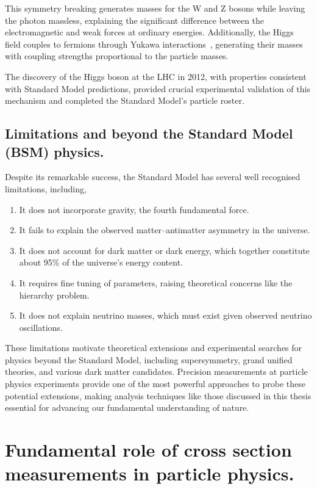 \begin{definition}
This symmetry breaking generates masses for the W and Z bosons while leaving the photon massless, explaining the significant difference between the electromagnetic and weak forces at ordinary energies. Additionally, the Higgs field couples to fermions through Yukawa interactions~\cite{DHoker1984DecouplingTheory}, generating their masses with coupling strengths proportional to the particle masses.

The discovery of the Higgs boson at the LHC in 2012, with properties consistent with Standard Model predictions, provided crucial experimental validation of this mechanism and completed the Standard Model's particle roster.

\subsection{Limitations and beyond the Standard Model (BSM) physics.}
Despite its remarkable success, the Standard Model has several well recognised limitations, including,

    \begin{enumerate}
        \item It does not incorporate gravity, the fourth fundamental force.
        \item It fails to explain the observed matter--antimatter asymmetry in the universe.
        \item It does not account for dark matter or dark energy, which together constitute about 95\% of the universe's energy content.
        \item  It requires fine tuning of parameters, raising theoretical concerns like the hierarchy problem.
        \item  It does not explain neutrino masses, which must exist given observed neutrino oscillations.
    \end{enumerate}
These limitations motivate theoretical extensions and experimental searches for physics beyond the Standard Model, including supersymmetry, grand unified theories, and various dark matter candidates.
%
Precision measurements at particle physics experiments provide one of the most powerful approaches to probe these potential extensions, making analysis techniques like those discussed in this thesis essential for advancing our fundamental understanding of nature.

\section{Fundamental role of cross section measurements in particle physics.}


\end{definition}
